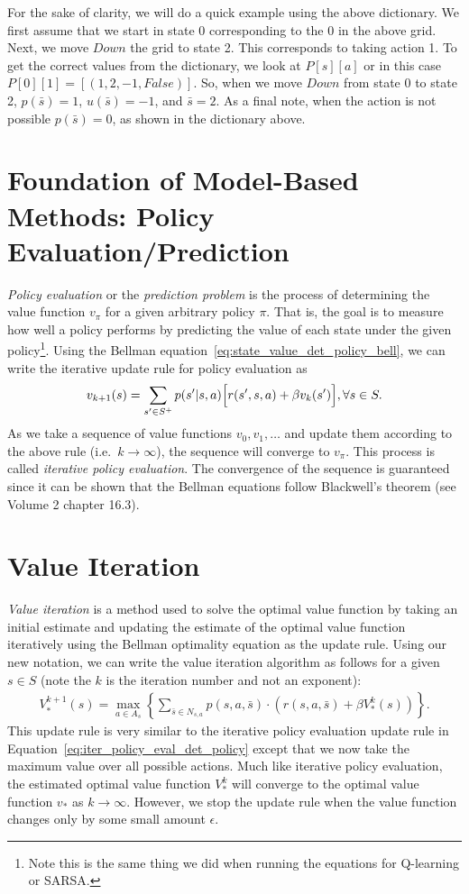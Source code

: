 For the sake of clarity, we will do a quick example using the above dictionary.
We first assume that we start in state 0 corresponding to the 0 in the above grid.
Next, we move $Down$ the grid to state 2.
This corresponds to taking action 1.
To get the correct values from the dictionary, we look at $P[s][a]$ or in this case $P[0][1] = [(1,2,-1,False)]$.
So, when we move $Down$ from state 0 to state 2, $p(\bar{s}) = 1$,  $u(\bar{s}) = -1$, and $\bar{s} = 2$.
As a final note, when the action is not possible $p(\bar{s}) = 0$, as shown in the dictionary above.

\section*{Foundation of Model-Based Methods: Policy Evaluation/Prediction}
\emph{Policy evaluation} or the \emph{prediction problem} is the process of determining the value function $v_\pi$ for a given arbitrary policy $\pi$.
That is, the goal is to measure how well a policy performs by predicting the value of each state under the given policy\footnote{Note this is the same thing we did when running the equations for Q-learning or SARSA.}.
Using the Bellman equation\ \ref{eq:state_value_det_policy_bell}, we can write the iterative update rule for policy evaluation as
\begin{align}
    v_{k+1}(s) = \sum_{s^\prime\in S^+} p(s^\prime|s,a) \Bigl[r(s^\prime,s,a) + \beta v_k(s^\prime)\Bigr],\forall s\in S.
    \label{eq:iter_policy_eval_det_policy}
\end{align}
As we take a sequence of value functions $v_0,v_1,\ldots$ and update them according to the above rule (i.e.\ $k\to\infty$), the sequence will converge to $v_\pi$.
This process is called \emph{iterative policy evaluation}.
The convergence of the sequence is guaranteed since it can be shown that the Bellman equations follow Blackwell's theorem (see Volume 2 chapter 16.3).

\section*{Value Iteration}
\emph{Value iteration} is a method used to solve the optimal value function by taking an initial estimate and updating the estimate of the optimal value function iteratively using the Bellman optimality equation as the update rule.
Using our new notation, we can write the value iteration algorithm as follows for a given $s\in S$ (note the $k$ is the iteration number and not an exponent):
\begin{align}
    V_{*}^{k+1}(s)= \max_{a\in A_s}\left\{ \sum_{\bar{s}\in N_{s,a}}p(s,a,\bar{s}) \cdot (r(s,a,\bar{s}) +\beta V_{*}^{k}(s)) \right\}.
    \label{eq:value_iter_update_rule_lab}
\end{align}
This update rule is very similar to the iterative policy evaluation update rule in Equation\ \ref{eq:iter_policy_eval_det_policy} except that we now take the maximum value over all possible actions.
Much like iterative policy evaluation, the estimated optimal value function $V_*^k$ will converge to the optimal value function $v_*$ as $k\to\infty$.
However, we stop the update rule when the value function changes only by some small amount $\epsilon$.

